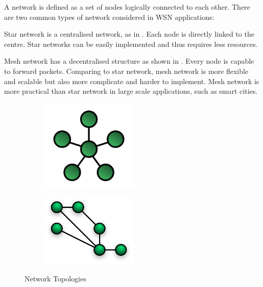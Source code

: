 A network is defined as a set of nodes logically connected to each other. There are two common types of network considered in WSN applications:
\begin{description}[style=nextline]
	\item[\textbf{Star Network}]
	Star network is a centralised network, as in . Each node is directly linked to the centre. Star networks can be easily implemented and thus requires less resources.
	\item[\textbf{Mesh Network}]
	Mesh network has a decentralised structure as shown in . Every node is capable to forward packets. Comparing to star network, mesh network is more flexible and scalable but also more complicate and harder to implement. Mesh network is more practical than star network in large scale applications, such as smart cities.
\end{description}

\begin{figure}
	\centering
	\begin{subfigure}[b]{0.5\textwidth}
		{
			\includegraphics[width=0.5\textwidth,]{fig/StarNetwork.png}
		}
		 \label{fig: Star Network}
	\end{subfigure}
	\begin{subfigure}[b]{0.5\textwidth}
		{
			\includegraphics[width=0.5\textwidth,]{fig/NetworkTopology-Mesh.png}
		}
		 \label{fig: Mesh Network}
	\end{subfigure}
	\caption{Network Topologies} \label{fig: Network topologies}
\end{figure}

